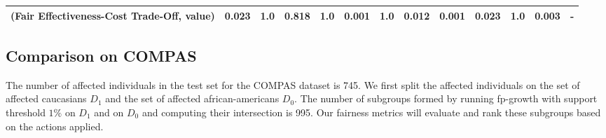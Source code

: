\documentclass{article}
\begin{document}
\begin{table}[ht]
{\begin{tabular}{lrrrrrrrrrrrr}
(Fair Effectiveness-Cost Trade-Off, value)         &                                     0.023 &                                       1.0 &                            0.818 &                              1.0 &               0.001 &                                                1.0 &                                              0.012 &                                     0.001 &                                     0.023 &                                       1.0 &                            0.003 &                                          - \\
\bottomrule
\end{tabular}
}
\end{table}





\subsection{Comparison on COMPAS}
The number of affected individuals in the test set for the COMPAS dataset is 745. We first split the affected individuals on the set of affected caucasians $D_{1}$ and the set of affected african-americans $D_{0}$. The number of subgroups formed by running fp-growth with support threshold $1\%$ on $D_{1}$ and on $D_{0}$ and computing their intersection is 995.  
Our fairness metrics will evaluate and rank these subgroups based on the actions applied.
\end{document}
